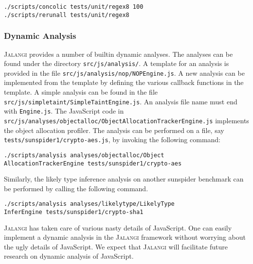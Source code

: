 \documentclass{sig-alternate}
\def\jalangi{\textsc{Jalangi}}
\begin{document}
\begin{verbatim}
./scripts/concolic tests/unit/regex8 100
./scripts/rerunall tests/unit/regex8
\end{verbatim}

\subsubsection*{Dynamic Analysis}
\label{sec:dynamic-analysis}

\jalangi{} provides a number of builtin dynamic analyses.  The
analyses can be found under the directory \texttt{src/js/analysis/}.
A template for an analysis is provided in the file
\texttt{src/js/analysis/nop/NOPEngine.js}.  A new analysis can be
implemented from the template by defining the various callback
functions in the template.  A simple analysis can be found in the file
\texttt{src/js/simpletaint/SimpleTaintEngine.js}.  An analysis file
name must end with \texttt{Engine.js}.  The JavaScript code in
\texttt{src/js/analyses/objectalloc/ObjectAllocationTrackerEngine.js}
implements the object allocation profiler. The analysis can be
performed on a file, say \texttt{tests/sunspider1/crypto-aes.js}, by
invoking the following command:

\begin{verbatim}
./scripts/analysis analyses/objectalloc/Object
AllocationTrackerEngine tests/sunspider1/crypto-aes
\end{verbatim}

Similarly, the likely type inference analysis on another sunspider
benchmark can be performed by calling the following command.

\begin{verbatim}
./scripts/analysis analyses/likelytype/LikelyType
InferEngine tests/sunspider1/crypto-sha1
\end{verbatim}
\jalangi{} has taken care of various nasty details of JavaScript.  One
can easily implement a dynamic analysis in the \jalangi{} framework
without worrying about the ugly details of JavaScript.  We expect that
\jalangi{} will facilitate future research on dynamic analysis of
JavaScript. 


\end{document}
